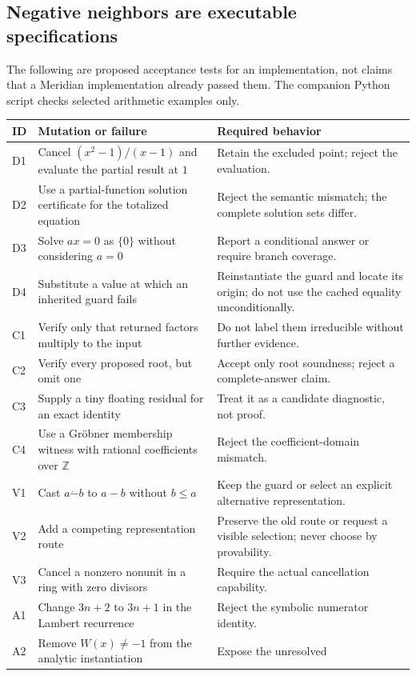 \documentclass[11pt,a4paper]{article}
\newcommand{\Z}{\mathbb Z}
\theoremstyle{remark}
\begin{document}
\subsection{Negative neighbors are executable specifications}
The following are proposed acceptance tests for an implementation, not claims
that a Meridian implementation already passed them. The companion Python script
checks selected arithmetic examples only.
\begin{longtable}{@{}L{.07\textwidth}L{.47\textwidth}L{.38\textwidth}@{}}
\toprule
ID & Mutation or failure & Required behavior \\
\midrule
\endhead
D1 & Cancel $(x^2-1)/(x-1)$ and evaluate the partial result at $1$ & Retain the
excluded point; reject the evaluation.\\
D2 & Use a partial-function solution certificate for the totalized equation &
Reject the semantic mismatch; the complete solution sets differ.\\
D3 & Solve $ax=0$ as $\{0\}$ without considering $a=0$ & Report a conditional
answer or require branch coverage.\\
D4 & Substitute a value at which an inherited guard fails & Reinstantiate the
guard and locate its origin; do not use the cached equality unconditionally.\\
C1 & Verify only that returned factors multiply to the input & Do not label them
irreducible without further evidence.\\
C2 & Verify every proposed root, but omit one & Accept only root soundness;
reject a complete-answer claim.\\
C3 & Supply a tiny floating residual for an exact identity & Treat it as a
candidate diagnostic, not proof.\\
C4 & Use a Gr\"obner membership witness with rational coefficients over $\Z$ &
Reject the coefficient-domain mismatch.\\
V1 & Cast $a\dot-b$ to $a-b$ without $b\le a$ & Keep the guard or select an
explicit alternative representation.\\
V2 & Add a competing representation route & Preserve the old route or request
a visible selection; never choose by provability.\\
V3 & Cancel a nonzero nonunit in a ring with zero divisors & Require the actual
cancellation capability.\\
A1 & Change $3n+2$ to $3n+1$ in the Lambert recurrence & Reject the symbolic
numerator identity.\\
A2 & Remove $W(x)\ne-1$ from the analytic instantiation & Expose the unresolved

\end{longtable}
\end{document}
